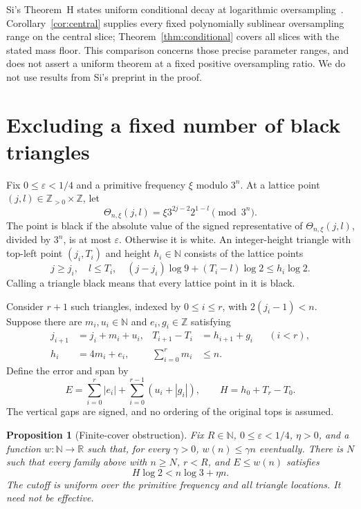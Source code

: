 \documentclass[11pt,a4paper]{article}
\newtheorem{proposition}[theorem]{Proposition}
\newcommand{\N}{\mathbb N}
\newcommand{\Z}{\mathbb Z}
\newcommand{\R}{\mathbb R}
\newcommand{\eps}{\varepsilon}
\newcommand{\abs}[1]{\left|#1\right|}
\begin{document}
Si's Theorem~H states uniform conditional decay at logarithmic
oversampling~\cite{Si}. Corollary~\ref{cor:central} supplies every fixed
polynomially sublinear oversampling range on the central slice;
Theorem~\ref{thm:conditional} covers all slices with the stated mass
floor. This comparison concerns those precise parameter ranges, and
does not assert a uniform theorem at a fixed positive oversampling
ratio. We do not use results from Si's preprint in the proof.

\section{Excluding a fixed number of black triangles}\label{sec:arithmetic}

Fix \(0\le\eps<1/4\) and a primitive frequency \(\xi\) modulo \(3^n\).
At a lattice point \((j,l)\in\Z_{>0}\times\Z\), let
\[
 \Theta_{n,\xi}(j,l)=\xi3^{2j-2}2^{1-l}\pmod{3^n}.
\]
The point is black if the absolute value of the signed representative
of \(\Theta_{n,\xi}(j,l)\), divided by \(3^n\), is at most \(\eps\).
Otherwise it is white. An integer-height triangle with top-left point
\((j_i,T_i)\) and height \(h_i\in\N\) consists of the lattice points
\begin{equation}\label{eq:triangle}
 j\ge j_i,\quad l\le T_i,\quad
 (j-j_i)\log9+(T_i-l)\log2\le h_i\log2.
\end{equation}
Calling a triangle black means that every lattice point in it is black.

Consider \(r+1\) such triangles, indexed by \(0\le i\le r\), with
\(2(j_i-1)<n\). Suppose there are \(m_i,u_i\in\N\) and
\(e_i,g_i\in\Z\) satisfying
\begin{align}\label{eq:schedules}
 j_{i+1}&=j_i+m_i+u_i,&
 T_{i+1}-T_i&=h_{i+1}+g_i &&(i<r),\\
 h_i&=4m_i+e_i,& \sum_{i=0}^r m_i&\le n.\nonumber
\end{align}
Define the error and span by
\begin{equation}\label{eq:error-span}
 E=\sum_{i=0}^r\abs{e_i}+\sum_{i=0}^{r-1}(u_i+\abs{g_i}),
 \qquad H=h_0+T_r-T_0.
\end{equation}
The vertical gaps are signed, and no ordering of the original tops is
assumed.

\begin{proposition}[Finite-cover obstruction]\label{prop:cover}
Fix \(R\in\N\), \(0\le\eps<1/4\), \(\eta>0\), and a function
\(w:\N\to\R\) such that, for every \(\gamma>0\),
\(w(n)\le\gamma n\) eventually. There is \(N\) such that every family
above with \(n\ge N\), \(r<R\), and \(E\le w(n)\) satisfies
\[
 H\log2<n\log3+\eta n.
\]
The cutoff is uniform over the primitive frequency and all triangle
locations. It need not be effective.
\end{proposition}
\end{document}
